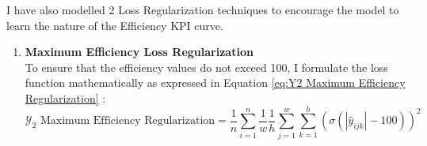 \documentclass{report} %
\begin{document}
I have also modelled 2 Loss Regularization techniques to encourage the model to learn the nature of the Efficiency \ac{KPI} curve.
\begin{enumerate}
\item \textbf{Maximum Efficiency Loss Regularization} \\
To ensure that the efficiency values do not exceed 100, I formulate the loss function mathematically as expressed in Equation \ref{eq:Y2 Maximum Efficiency Regularization} :
\begin{equation}
\text{$\mathcal{Y}_2$ Maximum Efficiency Regularization} = \frac{1}{n} \sum_{i=1}^{n}\frac{1}{w} \frac{1}{h} \sum_{j=1}^{w} \sum_{k=1}^{h}\left(\sigma(|\hat{y}_{ijk}| - 100)\right)^2 
\label{eq:Y2 Maximum Efficiency Regularization}
\end{equation} 


\end{enumerate}
\end{document}
